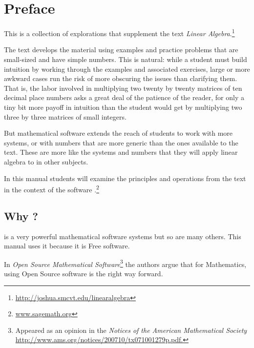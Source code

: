 \chapter*{Preface}\pagestyle{preface}\thispagestyle{preface}


This is a collection of explorations that supplement the text
\textit{Linear Algebra}.\footnote{\protect\url{http://joshua.smcvt.edu/linearalgebra}}

The text develops the material using examples and practice problems
that are small-sized and have simple numbers.
This is natural: while a student must build intuition by
working through the examples and
associated exercises, large or more awkward
cases run the risk of more obscuring the issues than 
clarifying them.
That is, the labor involved in multiplying two twenty by twenty matrices
of ten decimal place numbers asks a great deal of the patience of the
reader, for only a tiny bit more payoff in intuition than the student would
get by 
multiplying two three by three matrices of small integers. 

But mathematical software 
extends the reach of students to work with more systems, or
with numbers that are more generic than the ones available to  
the text.
These are more like the systems and numbers that they will apply linear 
algebra to in other subjects.

In this manual students will examine the principles and operations 
from the text in the context
of the software \sage{}.\footnote{\url{www.sagemath.org}}


\section{Why \sage?}
\sage{} is a very powerful mathematical software systems but so are
many others.
This manual uses it because it is Free software.

In 
\textit{Open Source Mathematical Software}\footnote{Appeared as an opinion in the \protect\textit{Notices of the American Mathematical Society} \protect\url{http://www.ams.org/notices/200710/tx071001279p.pdf.}}
the authors argue that for Mathematics, using Open Source software
is the right way forward.

